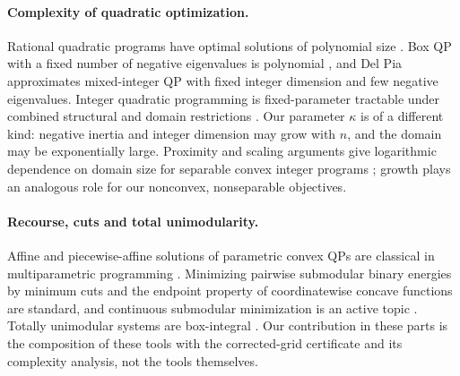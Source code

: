 \paragraph{Complexity of quadratic optimization.}
Rational quadratic programs have optimal solutions of polynomial size
\cite{Vavasis1990,DelPiaDeyMolinaro2017}. Box QP with a fixed number of
negative eigenvalues is polynomial \cite{Vavasis1992}, and Del Pia
\cite{DelPia2026} approximates mixed-integer QP with fixed integer
dimension and few negative eigenvalues. Integer quadratic programming is
fixed-parameter tractable under combined structural and domain restrictions
\cite{EibenGanianKnopOrdyniak2019}. Our parameter $\kappa$ is of a different
kind: negative inertia and integer dimension may grow with $n$, and the
domain may be exponentially large. Proximity and scaling arguments give
logarithmic dependence on domain size for separable convex integer
programs \cite{HochbaumShanthikumar1990,Hunkenschroder2026}; growth plays
an analogous role for our nonconvex, nonseparable objectives.

\paragraph{Recourse, cuts and total unimodularity.}
Affine and piecewise-affine solutions of parametric convex QPs are
classical in multiparametric programming \cite{Bemporad2002}. Minimizing
pairwise submodular binary energies by minimum cuts \cite{KolmogorovZabih2004}
and the endpoint property of coordinatewise concave functions are standard,
and continuous submodular minimization is an active topic
\cite{Bach2019,BurerNatarajanWillemsen2025}. Totally unimodular systems are
box-integral \cite{HoffmanKruskal1956,ChervetGrappeRobert2021}. Our
contribution in these parts is the composition of these tools with the
corrected-grid certificate and its complexity analysis, not the tools
themselves.

